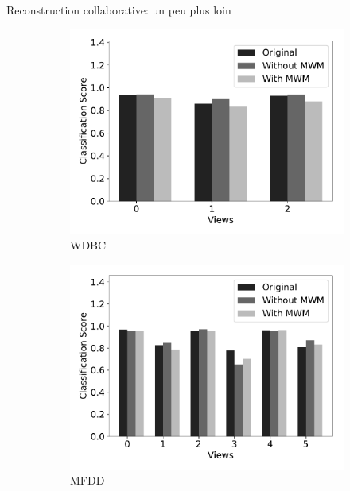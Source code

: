 \documentclass[hyperref={pdfpagelabels=false}]{beamer}
\begin{document}
    \begin{frame}{Reconstruction collaborative: un peu plus loin}
        \begin{figure}[!h]
            \centering
            \begin{subfigure}[c]{0.45\textwidth}
                \includegraphics[scale=.26]{cs_wdbc}
                \caption{WDBC}
            \end{subfigure}
            \begin{subfigure}[c]{0.45\textwidth}
                \includegraphics[scale=.26]{cs_mfeat}
                \caption{MFDD}
            \end{subfigure}\\
            \begin{subfigure}[c]{0.45\textwidth}

\end{subfigure}
\end{figure}
\end{frame}
\end{document}
